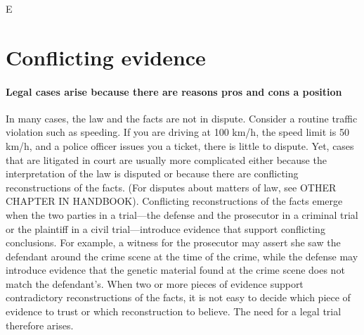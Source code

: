 \documentclass[10pt]{article}
\begin{document}
		E
			


\section{Conflicting evidence}

 	
\paragraph{Legal cases arise because there are reasons pros and cons a position} 


In many cases, the law and the facts are not in dispute. Consider a routine traffic violation such as speeding. 
If you are driving at 100 km/h, the speed limit is 50 km/h, and a police officer issues you a ticket, 
there is  little to dispute. Yet, cases that are litigated in court are usually more complicated either because the interpretation of 
the law is disputed or because there are conflicting reconstructions of the facts. 
(For disputes about matters of law, see OTHER CHAPTER IN HANDBOOK).
Conflicting reconstructions of the facts emerge when the two parties in a trial---the defense and the prosecutor in a criminal trial or 
the plaintiff in a civil trial---introduce evidence that support conflicting conclusions. 
For example, a witness for the prosecutor may assert she saw the defendant around the crime scene at the time of the crime, 
while the defense may introduce evidence that the genetic material found at the crime scene does not match the defendant's.
When two or more pieces of evidence support contradictory reconstructions of the facts, it is not easy 
to decide which piece of evidence to trust or which reconstruction to believe. The need for a legal trial therefore arises. 

\end{document}
